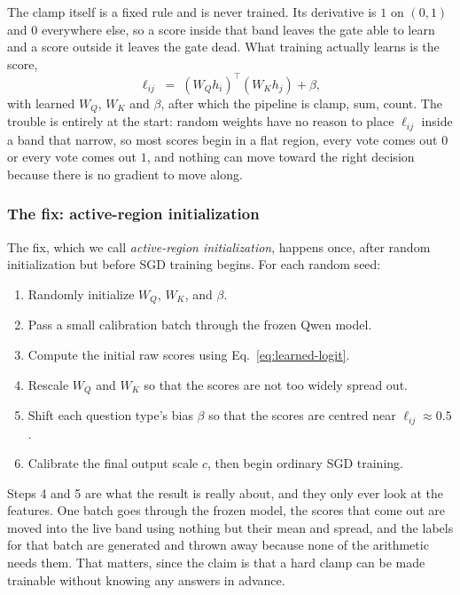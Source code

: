 \documentclass[10pt]{article}
\theoremstyle{definition}
\begin{document}
The clamp itself is a fixed rule and is never trained. Its derivative is
$1$ on $(0,1)$ and $0$ everywhere else, so a score inside that band leaves
the gate able to learn and a score outside it leaves the gate dead. What
training actually learns is the score,
\begin{equation}
\ell_{ij} \;=\; (W_Q h_i)^{\top}(W_K h_j) + \beta,
\label{eq:learned-logit}
\end{equation}
with learned $W_Q$, $W_K$ and $\beta$, after which the pipeline is clamp,
sum, count. The trouble is entirely at the start: random weights have no
reason to place $\ell_{ij}$ inside a band that narrow, so most scores begin
in a flat region, every vote comes out $0$ or every vote comes out $1$, and
nothing can move toward the right decision because there is no gradient to
move along.

\subsubsection*{The fix: active-region initialization}

The fix, which we call \emph{active-region initialization}, happens once,
after random initialization but before SGD training begins. For each
random seed:
\begin{enumerate}
\item Randomly initialize $W_Q$, $W_K$, and $\beta$.
\item Pass a small calibration batch through the frozen Qwen model.
\item Compute the initial raw scores using
  Eq.~\eqref{eq:learned-logit}.
\item Rescale $W_Q$ and $W_K$ so that the scores are not too widely spread
  out.
\item Shift each question type's bias $\beta$ so that the scores are
  centred near $\ell_{ij} \approx 0.5$.
\item Calibrate the final output scale $c$, then begin ordinary SGD
  training.
\end{enumerate}

Steps 4 and 5 are what the result is really about, and they only ever look
at the features. One batch goes through the frozen model, the scores that
come out are moved into the live band using nothing but their mean and
spread, and the labels for that batch are generated and thrown away because
none of the arithmetic needs them. That matters, since the claim is that a
hard clamp can be made trainable without knowing any answers in advance.
\end{document}
